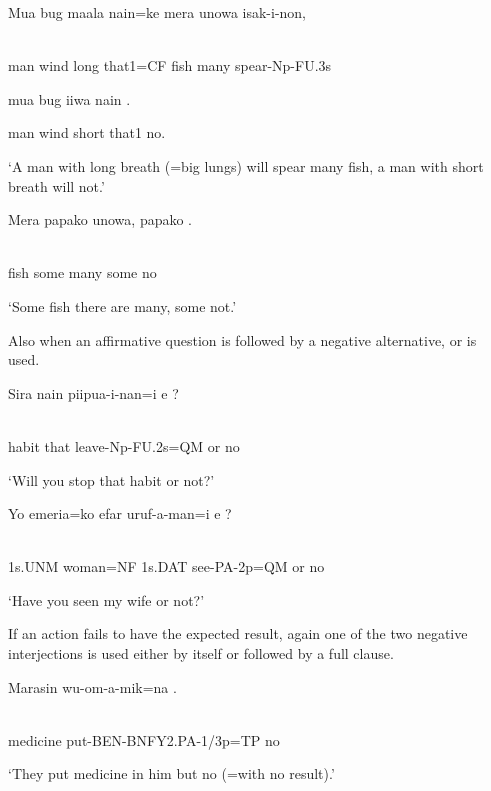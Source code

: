 \ea%
\label{ex:x1119}
\gll Mua  bug  maala  nain=ke  mera  unowa  isak-i-non, \\
      \\
\glt
\z

man  wind  long  that1=CF  fish  many  spear-Np-FU.3s

mua  bug  iiwa  nain  .

man  wind  short  that1  no.

`A man with long breath (=big lungs) will spear many fish, a man with short breath will not.'

\ea%
\label{ex:x1120}
\gll Mera  papako  unowa,  papako  . \\
      \\
\glt
\z

fish  some  many  some  no

`Some fish there are many, some not.'

Also when an affirmative question is followed by a negative alternative,  or  is used. 

\ea%
\label{ex:x1121}
\gll Sira  nain  piipua-i-nan=i  e  ? \\
      \\
\glt
\z

habit  that  leave-Np-FU.2s=QM  or  no

`Will you stop that habit or not?'

\ea%
\label{ex:x1122}
\gll Yo  emeria=ko  efar  uruf-a-man=i  e  ? \\
      \\
\glt
\z

1s.UNM  woman=NF  1s.DAT  see-PA-2p=QM  or  no

`Have you seen my wife or not?'

If an action fails to have the expected result, again one of the two negative interjections is used either by itself or followed by a full clause. 

\ea%
\label{ex:x1124}
\gll Marasin  wu-om-a-mik=na  . \\
      \\
\glt
\z

medicine  put-BEN-BNFY2.PA-1/3p=TP  no

`They put medicine in him but no (=with no result).'


